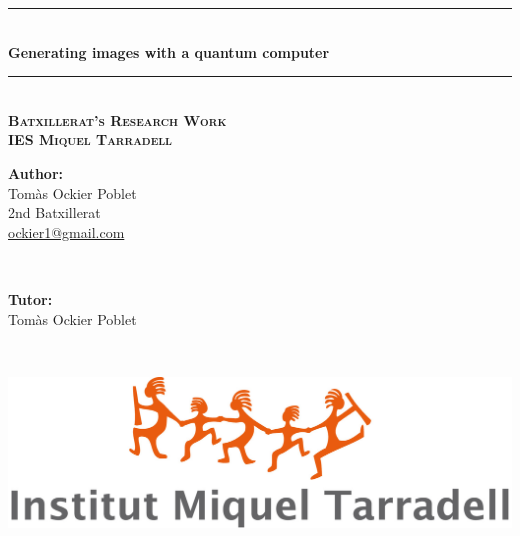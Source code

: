 \documentclass[a4paper,12pt,arial,numbered,print,index,oneside]{book}
\newcommand{\HRule}{\rule{\linewidth}{0.5mm}} %
\begin{document}
	\begin{titlepage}
		
		\center %
		

		
		\HRule \\[0.4cm]
		{ \Huge \bfseries Generating images with a quantum computer}\\[0.1cm] 
		\HRule \\[1.5cm]
		
		\textsc{\Large \textbf{Batxillerat's Research Work}}\\[.3cm]
		
		\textsc{\large \textbf{IES Miquel Tarradell}}\\[2cm]
		
		
		\vspace{8.3cm}
		\begin{minipage}{0.48\textwidth}
			\begin{flushleft} \large
				\Large \textbf{Author:}\\[0.1cm]
				\Large Tomàs Ockier Poblet \\ 2nd Batxillerat \\ \href{mailto:ockier1@gmail.com}{ockier1@gmail.com}
			\end{flushleft}
		\end{minipage}
		~
		\begin{minipage}{0.48\textwidth}
			\begin{flushright} \large
				\Large \textbf{Tutor:} \\[0.1cm]
				\Large Tomàs Ockier Poblet 
			\end{flushright}
		\end{minipage}\\[1.5cm]
		
		
		\begin{minipage}{0.85\textwidth}
			\begin{center}
								\includegraphics[scale=0.2]{Figures/Cover/logo-tarradell.jpg}
			\end{center}
		\end{minipage}
		

\end{titlepage}
\end{document}
